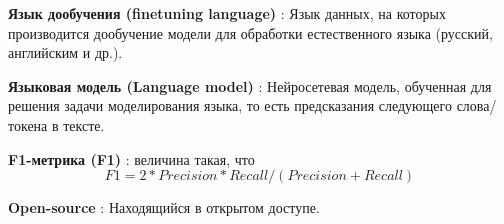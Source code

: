 \textbf{Язык дообучения (finetuning language)} : Язык данных, на которых производится дообучение модели для обработки естественного языка (русский, английским и др.).

\textbf{Языковая модель (Language model)} : Нейросетевая модель, обученная для решения задачи моделирования языка, то есть предсказания следующего слова/токена в тексте.

\textbf{F1-метрика (F1)} : величина такая, что \begin{equation}
F1 = 2*Precision*Recall/(Precision+Recall)
\end{equation}

\textbf{Open-source} : Находящийся в открытом доступе.

